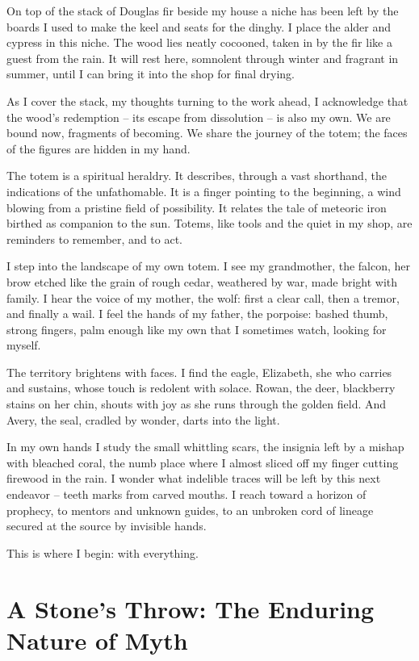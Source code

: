 \documentclass[10pt,DIV09,letterpaper,oneside,headsepline]{scrreprt}
\begin{document}
On top of the stack of Douglas fir beside my house a niche has been left by the boards I used to make the keel and seats for the dinghy. I place the alder and cypress in this niche. The wood lies neatly cocooned, taken in by the fir like a guest from the rain. It will rest here, somnolent through winter and fragrant in summer, until I can bring it into the shop for final drying.

As I cover the stack, my thoughts turning to the work ahead, I acknowledge that the wood's redemption -- its escape from dissolution -- is also my own. We are bound now, fragments of becoming. We share the journey of the totem; the faces of the figures are hidden in my hand.

The totem is a spiritual heraldry. It describes, through a vast shorthand, the indications of the unfathomable. It is a finger pointing to the beginning, a wind blowing from a pristine field of possibility. It relates the tale of meteoric iron birthed as companion to the sun. Totems, like tools and the quiet in my shop, are reminders to remember, and to act.

I step into the landscape of my own totem. I see my grandmother, the falcon, her brow etched like the grain of rough cedar, weathered by war, made bright with family. I hear the voice of my mother, the wolf: first a clear call, then a tremor, and finally a wail. I feel the hands of my father, the porpoise: bashed thumb, strong fingers, palm enough like my own that I sometimes watch, looking for myself.

The territory brightens with faces. I find the eagle, Elizabeth, she who carries and sustains, whose touch is redolent with solace. Rowan, the deer, blackberry stains on her chin, shouts with joy as she runs through the golden field. And Avery, the seal, cradled by wonder, darts into the light.

In my own hands I study the small whittling scars, the insignia left by a mishap with bleached coral, the numb place where I almost sliced off my finger cutting firewood in the rain. I wonder what indelible traces will be left by this next endeavor -- teeth marks from carved mouths. I reach toward a horizon of prophecy, to mentors and unknown guides, to an unbroken cord of lineage secured at the source by invisible hands.

This is where I begin: with everything.

\clearpage

\section{A Stone's Throw: The Enduring Nature of Myth}
\end{document}
